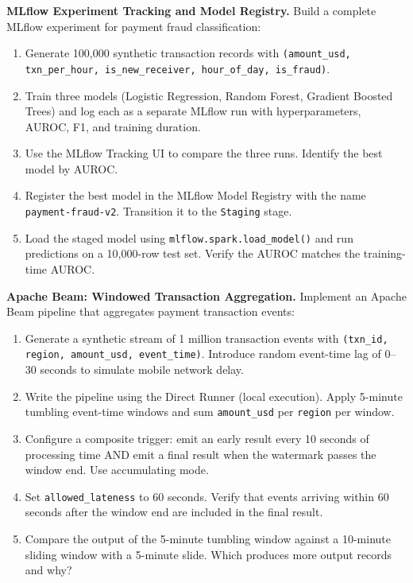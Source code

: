 \pe \textbf{MLflow Experiment Tracking and Model Registry.}
Build a complete MLflow experiment for payment fraud classification:
\begin{enumerate}[label=(\alph*)]
  \item Generate 100{,}000 synthetic transaction records with
        \texttt{(amount\_usd, txn\_per\_hour, is\_new\_receiver,
        hour\_of\_day, is\_fraud)}.
  \item Train three models (Logistic Regression, Random Forest,
        Gradient Boosted Trees) and log each as a separate MLflow run
        with hyperparameters, AUROC, F1, and training duration.
  \item Use the MLflow Tracking UI to compare the three runs. Identify
        the best model by AUROC.
  \item Register the best model in the MLflow Model Registry with the
        name \texttt{payment-fraud-v2}. Transition it to the
        \texttt{Staging} stage.
  \item Load the staged model using \texttt{mlflow.spark.load\_model()}
        and run predictions on a 10{,}000-row test set. Verify the
        AUROC matches the training-time AUROC.
\end{enumerate}

\pe \textbf{Apache Beam: Windowed Transaction Aggregation.}
Implement an Apache Beam pipeline that aggregates payment transaction events:
\begin{enumerate}[label=(\alph*)]
  \item Generate a synthetic stream of 1 million transaction events with
        \texttt{(txn\_id, region, amount\_usd, event\_time)}. Introduce
        random event-time lag of 0--30 seconds to simulate mobile network delay.
  \item Write the pipeline using the Direct Runner (local execution).
        Apply 5-minute tumbling event-time windows and sum
        \texttt{amount\_usd} per \texttt{region} per window.
  \item Configure a composite trigger: emit an early result every 10 seconds
        of processing time AND emit a final result when the watermark passes
        the window end. Use accumulating mode.
  \item Set \texttt{allowed\_lateness} to 60 seconds. Verify that events
        arriving within 60 seconds after the window end are included in
        the final result.
  \item Compare the output of the 5-minute tumbling window against a
        10-minute sliding window with a 5-minute slide. Which produces
        more output records and why?
\end{enumerate}

